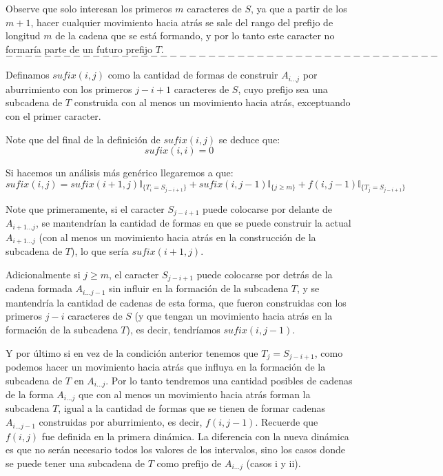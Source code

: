 \documentclass[a4paper]{article}
\begin{document}
    Observe que solo interesan los primeros $m$ caracteres de $S$, ya que a partir de los $m+1$,
    hacer cualquier movimiento hacia atr\'as se sale del rango del prefijo de longitud $m$ de la
    cadena que se est\'a formando, y por lo tanto este caracter no formar\'ia parte de un
    futuro prefijo $T$. \\

    

    
    
    $$---------------------------------------------$$
    
    Definamos $sufix(i,j)$ como la cantidad de formas de construir $A_{i...j}$ por aburrimiento con los primeros $j-i+1$ caracteres de $S$, cuyo prefijo sea una subcadena de $T$ construida con al menos un movimiento hacia atrás, exceptuando con el primer caracter.
    
    Note que del final de la definición de $sufix(i,j)$ se deduce que:
    $$sufix(i,i) = 0$$
    
    Si hacemos un análisis más genérico llegaremos a que:
    $$sufix(i,j) = sufix(i+1,j)\mathbb{I}_{ \{ T_i = S_{j-i+1} \}} + 
    sufix(i, j-1) \mathbb{I}_{ \{ j \ge m \}} + 
    f(i, j-1) \mathbb{I}_{ \{ T_j = S_{j-i+1}\}}$$
    
    Note que primeramente, si el caracter $S_{j-i+1}$ puede colocarse por delante de $A_{i+1...j}$, se mantendrían la cantidad de formas en que se puede construir la actual $A_{i+1...j}$ (con al menos un movimiento hacia atrás en la construcción de la subcadena de $T$), lo que sería $sufix(i+1,j)$.
    
    Adicionalmente si $j \ge m$, el caracter $S_{j-i+1}$ puede colocarse por detrás de la cadena formada $A_{i...j-1}$ sin influir en la formación de la subcadena $T$, y se mantendría la cantidad de cadenas de esta forma, que fueron construidas con los primeros $j-i$ caracteres de $S$ (y que tengan un movimiento hacia atrás en la formación de la subcadena $T$), es decir, tendríamos $sufix(i, j-1)$.
    
    Y por último si en vez de la condición anterior tenemos que $T_j = S_{j-i+1}$, como podemos hacer un movimiento hacia atrás que influya en la formación de la subcadena de $T$ en $A_{i...j}$. Por lo tanto tendremos una cantidad posibles de cadenas de la forma $A_{i...j}$ que con al menos un movimiento hacia atrás forman la subcadena $T$, igual a la cantidad de formas que se tienen de formar cadenas $A_{i...j-1}$ construidas por aburrimiento, es decir, $f(i,j-1)$. Recuerde que $f(i,j)$ fue definida en la primera dinámica. La diferencia con la nueva dinámica es que no serán necesario todos los valores de los intervalos, sino los casos donde se puede tener una subcadena de $T$ como prefijo de $A_{i...j}$ (casos i y ii).
    
\end{document}
